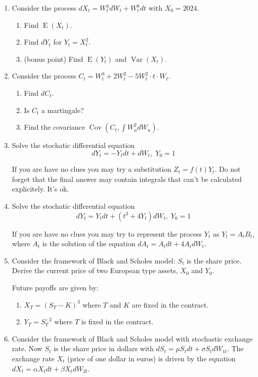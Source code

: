 \documentclass[12pt]{article}
\DeclareMathOperator{\Cov}{Cov}
\DeclareMathOperator{\Var}{Var}
\DeclareMathOperator{\E}{E}
\begin{document}
\begin{enumerate}

\item Consider the process $dX_t = W_t^4 dW_t + W_t^6 dt$ with $X_0 = 2024$.
\begin{enumerate}
  \item Find $\E(X_t)$.
  \item Find $dY_t$ for $Y_t = X_t^2$.
  \item (bonus point) Find $\E(Y_t)$ and $\Var(X_t)$.
\end{enumerate}

\item Consider the process $C_t = W_t^3 + 2W_t^2 - 5 W_t^2 \cdot t\cdot W_t$.
\begin{enumerate}
  \item Find $dC_t$. 
  \item Is $C_t$ a martingale?
  \item Find the covariance $\Cov(C_t, \int W^2_u dW_u)$.
\end{enumerate}

\item Solve the stochatic differential equation
\[
dY_t = - Y_t dt + dW_t, \; Y_0 = 1
\]

If you are have no clues you may try a substitution $Z_t = f(t) Y_t$. 
Do not forget that the final answer may contain integrals that can't be calculated explicitely. It's ok.

\item Solve the stochatic differential equation
\[
dY_t = Y_t dt + (t^3 + 4Y_t) dW_t, \; Y_0 = 1
\]

If you are have no clues you may try to represent the process $Y_t$ as $Y_t = A_t B_t$, 
where $A_t$ is the solution of the equation $dA_t = A_t dt + 4A_t dW_t$. 

\item Consider the framework of Black and Scholes model: $S_t$ is the share price. 
Derive the current price of two European type assets, $X_0$ and $Y_0$. 

Future payoffs are given by:
\begin{enumerate}
  \item $X_T = (S_T - K)^3$ where $T$ and $K$ are fixed in the contract.
  \item $Y_T = S_T^{-2}$ where $T$ is fixed in the contract. 
\end{enumerate}

\item Consider the framework of Black and Scholes model with stochastic exchange rate. 
Now $S_t$ is the share price in dollars with $dS_t = \mu S_t dt + \sigma S_t dW_{1t}$.
The exchange rate $X_t$ (price of one dollar in euros) is driven by the equation 
$dX_t = \alpha X_t dt + \beta X_t dW_{2t}$. 


\end{enumerate}
\end{document}
